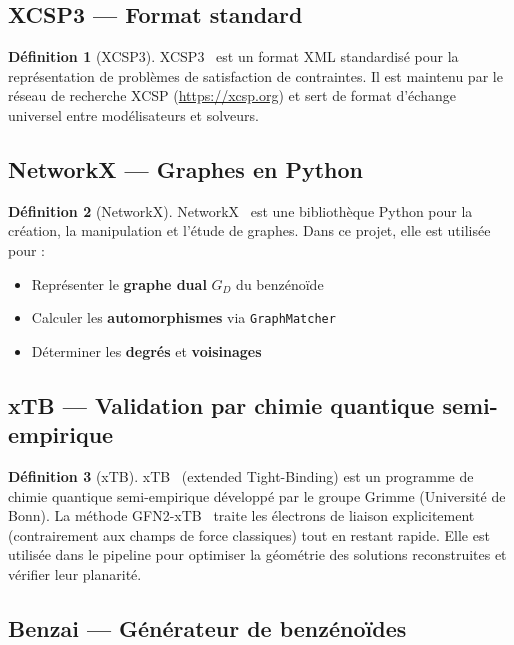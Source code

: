 \documentclass[12pt,a4paper]{article}
\theoremstyle{definition}
\newtheorem{definition}{Définition}[section]
\newcommand{\GD}{G_{\!D}}
\begin{document}
\subsection{XCSP3 — Format standard}

\begin{definition}[XCSP3]
  XCSP3~\cite{xcsp3} est un format XML standardisé pour la représentation de problèmes de
  satisfaction de contraintes. Il est maintenu par le réseau de recherche XCSP
  (\url{https://xcsp.org}) et sert de format d'échange universel entre modélisateurs et
  solveurs.
\end{definition}

\subsection{NetworkX — Graphes en Python}

\begin{definition}[NetworkX]
  NetworkX~\cite{networkx} est une bibliothèque Python pour la création, la manipulation et
  l'étude de graphes. Dans ce projet, elle est utilisée pour :
  \begin{itemize}
    \item Représenter le \textbf{graphe dual} $\GD$ du benzénoïde
    \item Calculer les \textbf{automorphismes} via \texttt{GraphMatcher}
    \item Déterminer les \textbf{degrés} et \textbf{voisinages}
  \end{itemize}
\end{definition}

\subsection{xTB — Validation par chimie quantique semi-empirique}

\begin{definition}[xTB]
  xTB~\cite{xtb} (extended Tight-Binding) est un programme de chimie quantique semi-empirique
  développé par le groupe Grimme (Université de Bonn). La méthode GFN2-xTB~\cite{gfn2xtb}
  traite les électrons de liaison explicitement (contrairement aux champs de force classiques)
  tout en restant rapide. Elle est utilisée dans le pipeline pour optimiser la géométrie des
  solutions reconstruites et vérifier leur planarité.
\end{definition}

\subsection{Benzai — Générateur de benzénoïdes}
\end{document}
